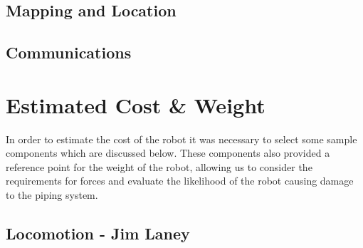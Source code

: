 \documentclass[11pt]{article}		%
\begin{document}
		\subsection{Mapping and Location}
		
		\subsection{Communications}
		
	\section{Estimated Cost \& Weight}
		
		In order to estimate the cost of the robot it was necessary to select some sample components which are discussed below.
		These components also provided a reference point for the weight of the robot, allowing us to consider the requirements for forces and evaluate the likelihood of the robot causing damage to the piping system.
		
		\subsection[Locomotion]{Locomotion - Jim Laney}
		
\end{document}
